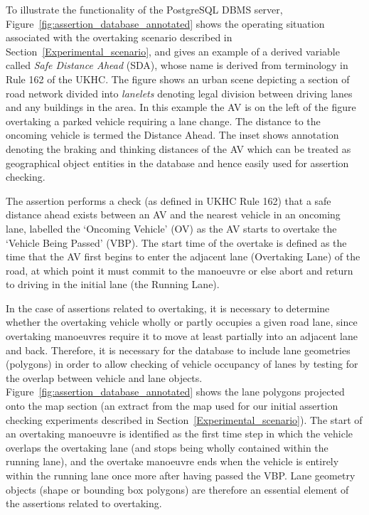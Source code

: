 To illustrate the functionality of the PostgreSQL DBMS server, Figure~\ref{fig:assertion_database_annotated} shows the operating situation associated with the overtaking scenario described in Section~\ref{Experimental_scenario}, and gives an example of a derived variable called \emph{Safe Distance Ahead} (SDA), whose name is derived from terminology in Rule 162 of the UKHC. The figure shows an urban scene depicting a section of road network divided into \emph{lanelets} denoting legal division between driving lanes and any buildings in the area. In this example the AV is on the left of the figure overtaking a parked vehicle requiring a lane change. The distance to the oncoming vehicle is termed the Distance Ahead. The inset shows annotation denoting the braking and thinking distances of the AV which can be treated as geographical object entities in the database and hence easily used for assertion checking. 

The assertion performs a check (as defined in UKHC Rule 162) that a safe distance ahead exists between an AV and the nearest vehicle in an oncoming lane, labelled the `Oncoming Vehicle' (OV) as the AV starts to overtake the `Vehicle Being Passed' (VBP). The start time of the overtake is defined as the time that the AV first begins to enter the adjacent lane (Overtaking Lane) of the road, at which point it must commit to the manoeuvre or else abort and return to driving in the initial lane (the Running Lane).

In the case of assertions related to overtaking, it is necessary to determine whether the overtaking vehicle wholly or partly occupies a given road lane, since overtaking manoeuvres require it to move at least partially into an adjacent lane and back. Therefore, it is necessary for the database to include lane geometries (polygons) in order to allow checking of vehicle occupancy of lanes by testing for the overlap between vehicle and lane objects. Figure~\ref{fig:assertion_database_annotated} shows the lane polygons projected onto the map section (an extract from the map used for our initial assertion checking experiments described in Section~\ref{Experimental_scenario}). The start of an overtaking manoeuvre is identified as the first time step in which the vehicle overlaps the overtaking lane (and stops being wholly contained within the running lane), and the overtake manoeuvre ends when the vehicle is entirely within the running lane once more after having passed the VBP. Lane geometry objects (shape or bounding box polygons) are therefore an essential element of the assertions related to overtaking.











